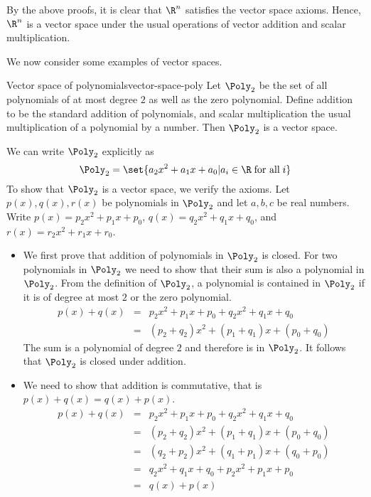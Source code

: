 \begin{solution}
By the above proofs, it is clear that $\R^n$ satisfies the vector space axioms. Hence, $\R^n$ is a vector space under the usual operations of vector addition and scalar multiplication. 
\end{solution}

We now consider some examples of vector spaces. 

\begin{example}{Vector space of polynomials}{vector-space-poly}
Let $\Poly_2$ be the set of all polynomials of at most degree $2$ as well as the zero polynomial. Define addition to be the standard addition of polynomials, and scalar multiplication the usual multiplication of a polynomial by a number. Then $\Poly_2$ is a vector space. 
\end{example}

\begin{solution}
We can write $\Poly_2$ explicitly as 
\[
\Poly_2 = \set{a_2x^2 + a_1x + a_0 | a_i \in \R \; \mbox{for all} \; i }
\]
To show that $\Poly_2$ is a vector space, we verify the axioms. Let $p(x), q(x), r(x)$ be polynomials in $\Poly_2$ and let $a,b,c$ be real numbers. Write $p(x)=p_2x^2 + p_1x + p_0$, $q(x)=q_2x^2 + q_1x + q_0$, and $r(x)=r_2x^2 + r_1x + r_0$. 

\begin{itemize}
\item
We first prove that addition of polynomials in $\Poly_2$ is closed. For two polynomials in $\Poly_2$ we need to show that their sum is also a polynomial in $\Poly_2$. From the definition of $\Poly_2$, a polynomial is contained in $\Poly_2$ if it is of degree at most $2$ or the zero polynomial.
\begin{eqnarray*}
p(x) + q(x) &=& p_2x^2 + p_1x + p_0 + q_2x^2+ q_1x + q_0 \\
&=& (p_2+q_2)x^2 + (p_1+q_1)x + (p_0+q_0) 
\end{eqnarray*}
The sum is a polynomial of degree $2$ and therefore is in $\Poly_2$. It follows that $\Poly_2$ is closed under addition. 

\item
We need to show that addition is commutative, that is $p(x)+q(x) = q(x) + p(x)$.   
\begin{eqnarray*}
p(x) + q(x) &=&  p_2x^2 + p_1x + p_0 + q_2x^2 + q_1x + q_0\\
&=& (p_2+q_2)x^2 + (p_1+q_1)x + (p_0+q_0)  \\
&=&  (q_2+p_2)x^2 + (q_1+p_1)x + (q_0+p_0)  \\
&=& q_2x^2 + q_1x + q_0 + p_2x^2  + p_1x + p_0\\
&=& q(x) + p(x)
\end{eqnarray*}


\end{itemize}
\end{solution}
